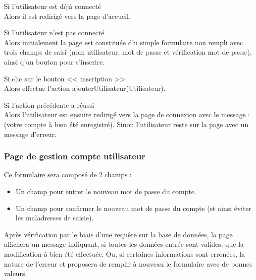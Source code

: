 			\begin{paragraphe}
				Si l'utilisateur est déjà connecté \\
				Alors il est redirigé vers la page d'accueil.
			\end{paragraphe}

			\begin{paragraphe}
				Si l'utilisateur n'est pas connecté \\
				Alors initialement la page est constituée d'u simple formulaire non rempli avec trois champs de saisi (nom utilisateur, mot de passe et vérification mot de passe), ainsi q'un bouton pour s'inscrire.
			\end{paragraphe}


			\begin{paragraphe}
				Si clic sur le bouton << inscription >> \\
				Alors effectue l'action ajouterUtilisateur(Utilisateur).
			\end{paragraphe}

			\begin{paragraphe}
				Si l'action précédente a réussi \\
				Alors l'utilisateur est ensuite redirigé vers la page de connexion avec le message : (votre compte à bien été enregistré).
				Sinon l'utilisateur reste sur la page avec un message d'erreur.
			\end{paragraphe}

		\subsubsection{Page de gestion compte utilisateur}

			\begin{paragraphe}
				Ce formulaire sera composé de 2 champs :
				\begin{itemize}
					\item Un champ pour entrer le nouveau mot de passe du compte.
					\item Un champ pour confirmer le nouveau mot de passe du compte (et ainsi éviter les maladresses de saisie).
				\end{itemize}
			\end{paragraphe}

			\begin{paragraphe}
				Après vérification par le biais d'une requête sur la base de données, la page affichera un message indiquant, si toutes les données entrée sont valides, que la modification à bien été effectuée. Ou, si certaines informations sont erronées, la nature de l'erreur et proposera de remplir à nouveau le formulaire avec de bonnes valeurs.
			\end{paragraphe}

